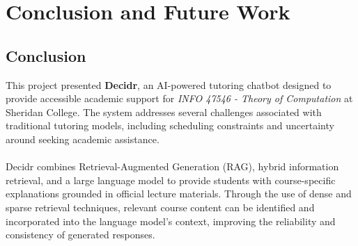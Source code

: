 \documentclass[12pt, a4paper]{report}
\begin{document}
\chapter{Conclusion and Future Work}

\section{Conclusion}

This project presented \textbf{Decidr}, an AI-powered tutoring chatbot designed to provide accessible academic support for \textit{INFO 47546 - Theory of Computation} at Sheridan College. The system addresses several challenges associated with traditional tutoring models, including scheduling constraints and uncertainty around seeking academic assistance.~\\~\\
Decidr combines Retrieval-Augmented Generation (RAG), hybrid information retrieval, and a large language model to provide students with course-specific explanations grounded in official lecture materials. Through the use of dense and sparse retrieval techniques, relevant course content can be identified and incorporated into the language model's context, improving the reliability and consistency of generated responses.
\end{document}
